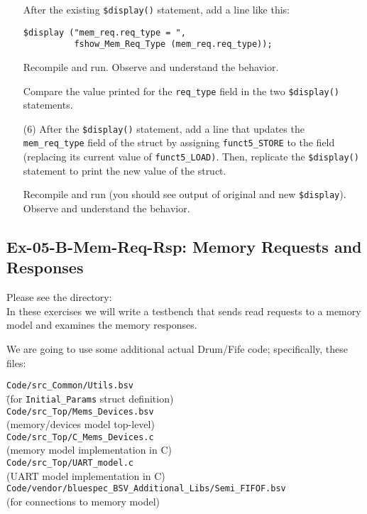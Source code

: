 \begin{itemize}
    After the existing \verb|$display()| statement, add a line like this:

    \hmm \verb|$display ("mem_req.req_type = ",| \\
    \hmm \verb|          fshow_Mem_Req_Type (mem_req.req_type));|

    Recompile and run. Observe and understand the behavior.

    Compare the value printed for the \verb|req_type| field in the two
    \verb|$display()| statements.

\item[(6)] After the \verb|$display()| statement, add a line that
    updates the \verb|mem_req_type| field of the struct by assigning
    \verb|funct5_STORE| to the field (replacing its current value of
    \verb|funct5_LOAD)|. Then, replicate the \verb|$display()|
    statement to print the new value of the struct.

    Recompile and run (you should see output of original and new
    \verb|$display|).  Observe and understand the behavior.

\end{itemize}


\subsection*{Ex-05-B-Mem-Req-Rsp: Memory Requests and Responses}
\label{Ex-05-B-Mem-Req-Rsp}

Please see the directory:  \\
In these exercises we will write a testbench that sends read requests
to a memory model and examines the memory responses.

We are going to use some additional actual Drum/Fife code;
specifically, these files:

\begin{tabbing}
\hmmmm \= \verb|Code/src_Common/Utils.bsv| \\
       \> \hmmmm \= (for \verb|Initial_Params| struct definition) \\
       \> \verb|Code/src_Top/Mems_Devices.bsv| \\
       \>        \> (memory/devices model top-level) \\
       \> \verb|Code/src_Top/C_Mems_Devices.c| \\
       \>        \> (memory model implementation in C) \\
       \> \verb|Code/src_Top/UART_model.c| \\
       \>        \> (UART model implementation in C) \\
       \> \verb|Code/vendor/bluespec_BSV_Additional_Libs/Semi_FIFOF.bsv| \\
       \>        \> (for connections to memory model)
\end{tabbing}

